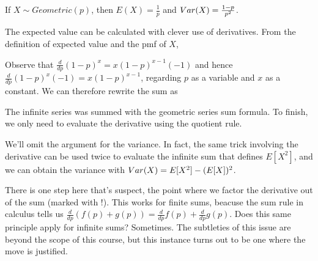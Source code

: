 \begin{thm}\label{GeometricExpectation}
If $X \sim Geometric(p)$, then $E(X) = \frac{1}{p}$ and $Var(X) = \frac{1-p}{p^2}$.
\end{thm}
\begin{pf} The expected value can be calculated with clever use of derivatives. From the definition of expected value and the pmf of $X$,
\par
\noindent Observe that $\frac{d}{dp}(1-p)^x = x(1-p)^{x-1}(-1)$ and hence $\frac{d}{dp}(1-p)^x(-1) = x(1-p)^{x-1}$, regarding $p$ as a variable and $x$ as a constant. We can therefore rewrite the sum as
\par
\noindent The infinite series was summed with the geometric series sum formula. To finish, we only need to evaluate the derivative using the quotient rule.
\end{pf}

\par
We'll omit the argument for the variance. In fact, the same trick involving the derivative can be used twice to evaluate the infinite sum that defines $E[X^2]$, and we can obtain the variance with $Var(X) = E[X^2] - (E[X])^2$.
\par
There is one step here that's suspect, the point where we factor the derivative out of the sum (marked with !). This works for finite sums, beacuse the sum rule in calculus tells us $\frac{d}{dp}(f(p) + g(p)) = \frac{d}{dp} f(p) + \frac{d}{dp} g(p)$. Does this same principle apply for infinite sums? Sometimes. The subtleties of this issue are beyond the scope of this course, but this instance turns out to be one where the move is justified.

